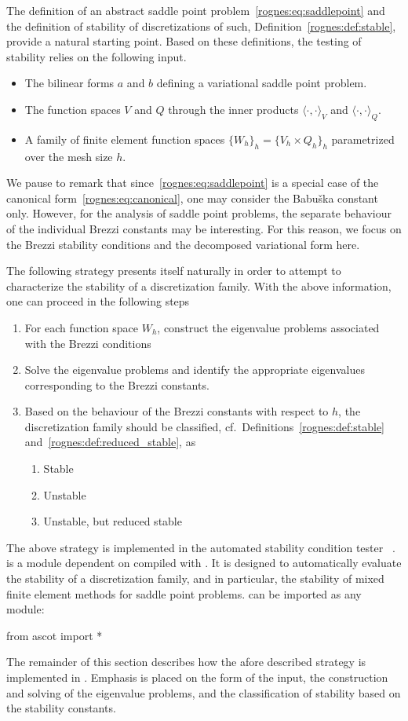 The definition of an abstract saddle point
problem~\eqref{rognes:eq:saddlepoint} and the definition of stability
of discretizations of such, Definition~\ref{rognes:def:stable},
provide a natural starting point. Based on these definitions, the
testing of stability relies on the following input.
\begin{itemize}
\item The bilinear forms $a$ and $b$ defining a variational
  saddle point problem.
\item The function spaces $V$ and $Q$ through the inner products
  $\langle \cdot, \cdot \rangle_{V}$ and $\langle \cdot, \cdot
  \rangle_{Q}$.
\item A family of finite element function spaces $\{W_h\}_h = \{V_h
  \times Q_h \}_h$ parametrized over the mesh size $h$.
\end{itemize}
We pause to remark that since~\eqref{rognes:eq:saddlepoint} is a special case
of the canonical form~\eqref{rognes:eq:canonical}, one may consider the
Babu\v ska constant only. However, for the analysis of saddle point
problems, the separate behaviour of the individual Brezzi constants
may be interesting. For this reason, we focus on the Brezzi stability
conditions and the decomposed variational form here.

The following strategy presents itself naturally in order to attempt
to characterize the stability of a discretization family. With the
above information, one can proceed in the following steps
\begin{enumerate}
\item For each function space $W_h$, construct the eigenvalue problems
  associated with the Brezzi conditions
\item Solve the eigenvalue problems and identify the appropriate
  eigenvalues corresponding to the Brezzi constants.
\item Based on the behaviour of the Brezzi constants with respect to
  $h$, the discretization family should be classified,
  cf.~Definitions~\ref{rognes:def:stable} and~\ref{rognes:def:reduced_stable}, as
  \begin{enumerate}
  \item Stable
  \item Unstable
  \item Unstable, but reduced stable
  \end{enumerate}
\end{enumerate}

The above strategy is implemented in the automated stability condition
tester \ascot{}~\cite{www:ascot}. \ascot{} is a \pythonlang{} module
dependent on \pydolfin{} compiled with \slepc{}. It is designed to
automatically evaluate the stability of a discretization family, and
in particular, the stability of mixed finite element methods for
saddle point problems. \ascot{} can be imported as any \pythonlang{}
module:
\begin{python}
  from ascot import *
\end{python}
The remainder of this section describes how the afore described
strategy is implemented in \ascot{}. Emphasis is placed on the form of
the input, the construction and solving of the eigenvalue problems,
and the classification of stability based on the stability constants.

